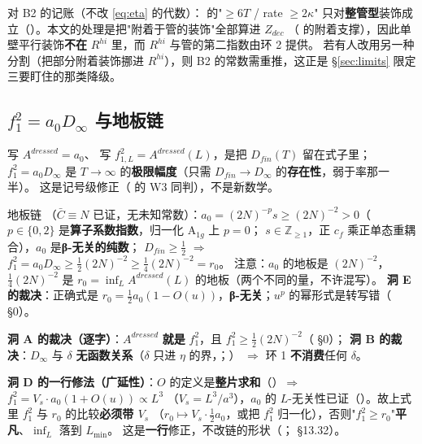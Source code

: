 \LM{} 对 B2 的记账（不改 \eqref{eq:eta} 的代数）： 的"$\ge6T$ / rate $\ge2\kappa$"
只对\textbf{整管型}装饰成立（）。本文的处理是把"附着于管的装饰"全部算进 $Z_{dec}$
（ 的附着支撑），因此单壁平行装饰\textbf{不在} $R^{hi}$ 里，而 $R^{hi}$ 与管的第二指数由环 2 提供。
若有人改用另一种分割（把部分附着装饰挪进 $R^{hi}$），则 B2 的常数需重推，这正是 \S\ref{sec:limits} 限定三要盯住的那类降级。

\subsection{$f_1^2=a_0D_\infty$ 与地板链}

\LM{}  写 $A^{dressed}=a_0$、 写 $f_{1,L}^2=A^{dressed}(L)$，是把 $D_{fin}(T)$ 留在式子里；
$f_1^2=a_0D_\infty$ 是 $T\to\infty$ 的\textbf{极限幅度}（只需 $D_{fin}\to D_\infty$ 的\textbf{存在性}，弱于率那一半）。
这是记号级修正（ 的 W3 同判），不是新数学。\LM
{}

地板链 \LT{}（$\bar C\equiv N$ 已证，无未知常数）：$a_0=(2N)^{-p}s\ge(2N)^{-2}>0$（$p\in\{0,2\}$ 是\textbf{算子系数指数}，归一化 $\mathrm{A}_{1g}$ 上 $p=0$；
$s\in\mathbb{Z}_{\ge1}$，正 $c_f$ 乘正单态重耦合），$a_0$ 是\textbf{β-无关的纯数}；
$D_{fin}\ge\tfrac12$ $\Rightarrow$ $f_1^2=a_0D_\infty\ge\tfrac12(2N)^{-2}\ge\tfrac14(2N)^{-2}=r_0$。
注意：$a_0$ 的地板是 $(2N)^{-2}$，$\tfrac14(2N)^{-2}$ 是 $r_0=\inf_LA^{dressed}(L)$ 的地板（两个不同的量，不许混写）。
\textbf{洞 E 的裁决}：正确式是 $r_0=\tfrac12a_0(1-O(u))$，\textbf{β-无关}；$u^p$ 的幂形式是转写错（ \S0）。\LM
{}

\textbf{洞 A 的裁决（逐字）}：$A^{dressed}$ \textbf{就是} $f_1^2$，且 $f_1^2\ge\tfrac12(2N)^{-2}$（ \S0）；
\textbf{洞 B 的裁决}：$D_\infty$ 与 $\delta$ \textbf{无函数关系}（$\delta$ 只进 $\eta$ 的界，；）
$\Rightarrow$ 环 1 \textbf{不消费}任何 $\delta$。\LT
{}

\LM{} \textbf{洞 D 的一行修法（广延性）}：$O$ 的定义是\textbf{整片求和}（）$\Rightarrow$ $f_1^2=V_s\cdot a_0(1+O(u))\propto L^3$
（$V_s=L^3/a^3$），$a_0$ 的 $L$-无关性已证（）。故上式里 $f_1^2$ 与 $r_0$ 的比较\textbf{必须带 $V_s$}
（$r_0\mapsto V_s\cdot\tfrac12a_0$，或把 $f_1^2$ 归一化），否则"$f_1^2\ge r_0$"\textbf{平凡}、$\inf_L$ 落到 $L_{\min}$。
这是\textbf{一行}修正，不改链的形状（； §13.32）。\LM

